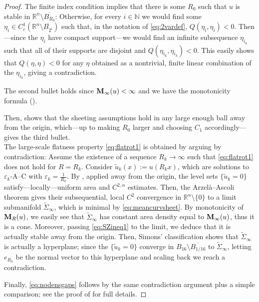 \documentclass{article}
\newcommand{\N}{\mathbb{N}}
\newcommand{\R}{\mathbb{R}}
\newcommand{\ep}{\varepsilon}
\theoremstyle{definition}
\begin{document}
\begin{proof}
The finite index condition implies that there is some $R_0$ such that $u$ is stable in $\R^n\setminus \overline{B_{R_0}}$: Otherwise, for every $i\in\N$ we would find some $\eta_i\in C_c^1(\R^n\setminus \overline{B_{2^i}})$ such that, in the notation of \eqref{eq:2vardef}, $Q(\eta_i,\eta_i)<0$. Then---since the $\eta_i$ have compact support---we would find an infinite subsequence $\eta_{i_k}$ such that all of their supports are disjoint and $Q(\eta_{i_k},\eta_{i_k})<0$. This easily shows that $Q(\eta,\eta)<0$ for any $\eta$ obtained as a nontrivial, finite linear combination of the $\eta_{i_k}$, giving a contradiction.

The second bullet holds since ${\bf M}_\infty(u)<\infty$ and we have the monotonicity formula ().

Then,  shows that the sheeting assumptions hold in any large enough ball away from the origin, which---up to making $R_0$ larger and choosing $C_1$ accordingly---gives the third bullet.\\

    The large-scale flatness property \eqref{eq:flatrot1} is obtained by arguing by contradiction: Assume the existence of a sequence $R_k\to\infty$ such that \eqref{eq:flatrot1} does not hold for $R=R_k$. Consider $\widetilde u_k(x):=u(R_k x)$, which are solutions to $\ep_k$-A--C with $\ep_k=\frac{1}{R_k}$. By , applied away from the origin, the level sets $\{\widetilde u_k=0\}$ satisfy---locally---uniform  area and $C^{2,\alpha}$ estimates. Then, the Arzel\`a--Ascoli theorem gives their subsequential, local $C^2$ convergence in $\R^n\setminus\{0\}$ to a limit submanifold $\widetilde\Sigma_\infty$, which is minimal by \eqref{eq:meancurvsheet}. By monotonicity of ${\bf M}_R(u)$, we easily see that $\widetilde\Sigma_\infty$ has constant area density equal to ${\bf M}_\infty(u)$, thus it is a cone. Moreover, passing \eqref{eq:SZineq1} to the limit, we deduce that it is actually stable away from the origin. Then, Simons' classification \cite{Simons68} shows that $\widetilde\Sigma_\infty$ is actually a hyperplane; since the $\{\widetilde u_k=0\}$ converge in $B_{16}\setminus \overline{B_{1/16}}$ to $\widetilde\Sigma_\infty$, letting $e_{R_k}$ be the normal vector to this hyperplane and scaling back we reach a contradiction.

    Finally, \eqref{eq:nodensgaps} follows by the same contradiction argument plus a simple comparison; see the proof of \cite[Proposition 3.10]{FSstable} for full details.
\end{proof}
\end{document}
